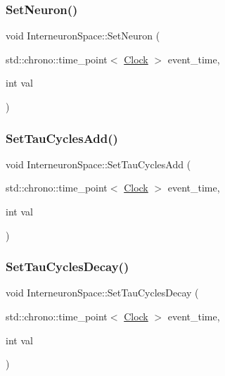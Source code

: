 \mbox{\label{classInterneuronSpace_a50aaa97f71011dafb583dc432817f477}} 
\subsubsection{\texorpdfstring{Set\+Neuron()}{SetNeuron()}}
{\footnotesize\ttfamily void Interneuron\+Space\+::\+Set\+Neuron (\begin{DoxyParamCaption}\item[{std\+::chrono\+::time\+\_\+point$<$ \mbox{\hyperlink{universe_8h_a0ef8d951d1ca5ab3cfaf7ab4c7a6fd80}{Clock}} $>$}]{event\+\_\+time,  }\item[{int}]{val }\end{DoxyParamCaption})}

\mbox{\label{classInterneuronSpace_ad6c1387daa261a3e8e1dba1402101d5c}} 
\subsubsection{\texorpdfstring{Set\+Tau\+Cycles\+Add()}{SetTauCyclesAdd()}}
{\footnotesize\ttfamily void Interneuron\+Space\+::\+Set\+Tau\+Cycles\+Add (\begin{DoxyParamCaption}\item[{std\+::chrono\+::time\+\_\+point$<$ \mbox{\hyperlink{universe_8h_a0ef8d951d1ca5ab3cfaf7ab4c7a6fd80}{Clock}} $>$}]{event\+\_\+time,  }\item[{int}]{val }\end{DoxyParamCaption})\hspace{0.3cm}{\ttfamily [inline]}}

\mbox{\label{classInterneuronSpace_a7f44a965e377ecdc5c387af2b5d30d69}} 
\subsubsection{\texorpdfstring{Set\+Tau\+Cycles\+Decay()}{SetTauCyclesDecay()}}
{\footnotesize\ttfamily void Interneuron\+Space\+::\+Set\+Tau\+Cycles\+Decay (\begin{DoxyParamCaption}\item[{std\+::chrono\+::time\+\_\+point$<$ \mbox{\hyperlink{universe_8h_a0ef8d951d1ca5ab3cfaf7ab4c7a6fd80}{Clock}} $>$}]{event\+\_\+time,  }\item[{int}]{val }\end{DoxyParamCaption})\hspace{0.3cm}{\ttfamily [inline]}}

